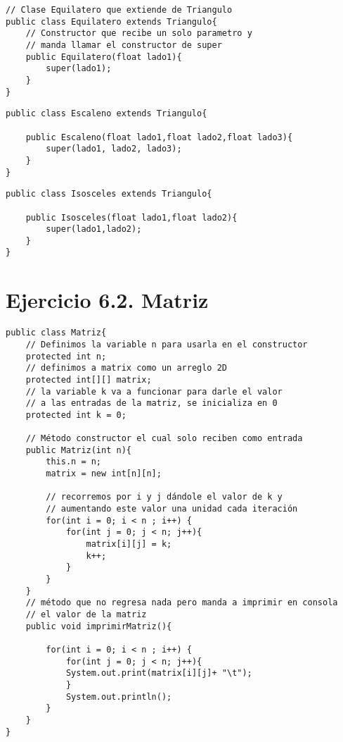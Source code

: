 \documentclass[11pt, oneside]{article}
\begin{document}
\begin{verbatim}
// Clase Equilatero que extiende de Triangulo
public class Equilatero extends Triangulo{
    // Constructor que recibe un solo parametro y 
    // manda llamar el constructor de super
    public Equilatero(float lado1){
        super(lado1);
    }
}
\end{verbatim}

\begin{verbatim}
public class Escaleno extends Triangulo{

    public Escaleno(float lado1,float lado2,float lado3){
        super(lado1, lado2, lado3);
    }
}
\end{verbatim}

\begin{verbatim}
public class Isosceles extends Triangulo{

    public Isosceles(float lado1,float lado2){
        super(lado1,lado2);
    }
}
\end{verbatim}

\section*{Ejercicio 6.2. Matriz}

\begin{verbatim}
public class Matriz{
    // Definimos la variable n para usarla en el constructor
    protected int n;
    // definimos a matrix como un arreglo 2D
    protected int[][] matrix;
    // la variable k va a funcionar para darle el valor 
    // a las entradas de la matriz, se inicializa en 0
    protected int k = 0;

    // Método constructor el cual solo reciben como entrada
    public Matriz(int n){
        this.n = n;
        matrix = new int[n][n];

        // recorremos por i y j dándole el valor de k y 
        // aumentando este valor una unidad cada iteración
        for(int i = 0; i < n ; i++) {
            for(int j = 0; j < n; j++){
                matrix[i][j] = k;
                k++;
            }
        }
    }
    // método que no regresa nada pero manda a imprimir en consola
    // el valor de la matriz
    public void imprimirMatriz(){

        for(int i = 0; i < n ; i++) {
            for(int j = 0; j < n; j++){
            System.out.print(matrix[i][j]+ "\t");           
            }
            System.out.println();   
        }
    }
}
\end{verbatim}
\end{document}
